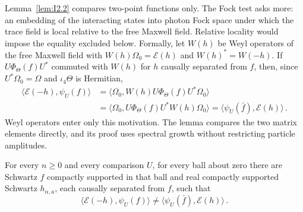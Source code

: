 Lemma~\ref{lem:I2.2} compares two-point functions only. The Fock test asks more: an embedding of the interacting states into photon Fock space under which the trace field is local relative to the free Maxwell field. Relative locality would impose the equality excluded below. Formally, let $W(h)$ be Weyl operators of the free Maxwell field with $W(h)\Omega_0=\mathcal E(h)$ and $W(h)^*=W(-h)$. If $U\Phi_\Theta(f)U^*$ commuted with $W(h)$ for $h$ causally separated from $f$, then, since $U^*\Omega_0=\Omega$ and $\iota_4\Theta$ is Hermitian,
\begin{align*}
\langle\mathcal E(-h),\psi_U(f)\rangle
&=\langle\Omega_0,W(h)U\Phi_\Theta(f)U^*\Omega_0\rangle\\
&=\langle\Omega_0,U\Phi_\Theta(f)U^*W(h)\Omega_0\rangle
=\langle\psi_U(\bar f),\mathcal E(h)\rangle\,.
\end{align*}
Weyl operators enter only this motivation. The lemma compares the two matrix elements directly, and its proof uses spectral growth without restricting particle amplitudes.
\begin{lemma}\label{lem:I2.3}
For every $n\ge0$ and every comparison $U$, for every ball about zero there are Schwartz $f$ compactly supported in that ball and real compactly supported Schwartz $h_{\alpha,a}$, each causally separated from $f$, such that
\begin{equation*}
\langle\mathcal E(-h),\psi_U(f)\rangle
\ne\langle\psi_U(\bar f),\mathcal E(h)\rangle\,.
\end{equation*}
\end{lemma}
